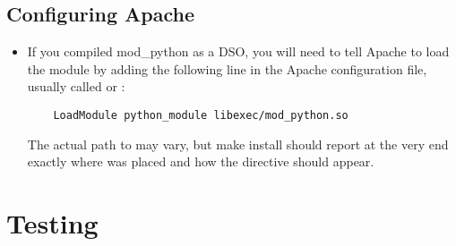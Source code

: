 \subsection{Configuring Apache\label{inst-apacheconfig}}

\begin{itemize}

\item
  If you compiled mod_python as a DSO, you will need to tell Apache to
  load the module by adding the following line in the Apache
  configuration file, usually called  or
  :

  \begin{verbatim}
    LoadModule python_module libexec/mod_python.so
  \end{verbatim}

  The actual path to  may vary, but make install
  should report at the very end exactly where 
  was placed and how the  directive should appear.

\end{itemize}

\section{Testing\label{inst-testing}}

